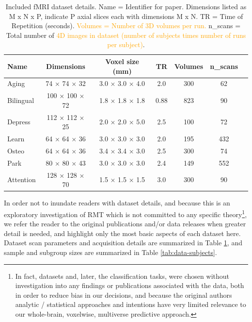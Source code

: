 \documentclass[12pt]{spieman}  %
\begin{document}
\begin{spacing}{2}
\begin{table}[h!]
\caption{
    \label{tab:data-dimensions}
    Included fMRI dataset details.
    Name = Identifier for paper.
    Dimensions listed as M x N x P, indicate P axial slices each with dimensions M x N.
    TR = Time of Repetition (seconds).
    \textcolor{orange}{Volumes = Number of 3D volumes per run.}
    n\_scans = Total number of \textcolor{orange}{4D images in dataset (number of subjects times number of runs per subject)}.
}
\small
\centering
\begin{tabular}{ l c c c c c c }
\hline
\textbf{Name}    & \textbf{Dimensions}  & \textbf{Voxel size (mm)} & \textbf{TR} & \textbf{Volumes} & \textbf{n\_scans} \\
\hline
Aging     & 74 × 74 × 32   & 3.0 × 3.0 × 4.0 & 2.0  & 300 & 62  \\
Bilingual    & 100 × 100 × 72 & 1.8 × 1.8 × 1.8 & 0.88 & 823 & 90  \\
Depress   & 112 × 112 × 25 & 2.0 × 2.0 × 5.0 & 2.5  & 100 & 72  \\
Learn     & 64 × 64 × 36   & 3.0 × 3.0 × 3.0 & 2.0  & 195 & 432 \\
Osteo     & 64 × 64 × 36   & 3.4 × 3.4 × 3.0 & 2.5  & 300 & 74  \\
Park      & 80 × 80 × 43   & 3.0 × 3.0 × 3.0 & 2.4  & 149 & 552 \\
Attention & 128 × 128 × 70 & 1.5 × 1.5 × 1.5 & 3.0  & 300 & 90  \\
\hline
\end{tabular}
\end{table}

In order not to inundate readers with dataset details, and because this is an
exploratory investigation of RMT which is not committed to any specific
theory\footnote{In fact, datasets and, later, the classification tasks, were
chosen without investigation into any findings or publications associated with
the data, both in order to reduce bias in our decisions, and because the
original authors analytic / statistical approaches and intentions have very
limited relevance to our whole-brain, voxelwise, multiverse predictive
approach.}, we refer the reader to the original publications and/or data
releases when greater detail is needed, and highlight only the most basic
aspects of each dataset here.  Dataset scan parameters and acquisition details
are summarized in Table \ref{tab:data-dimensions}, and sample and subgroup
sizes are summarized in Table \ref{tab:data-subjects}.


\end{spacing}
\end{document}
